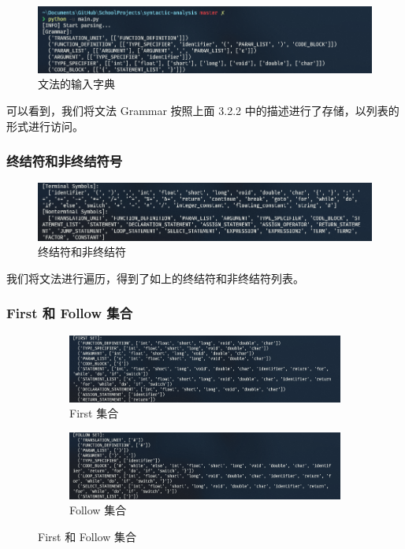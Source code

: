\documentclass[UTF8]{ctexart}
\begin{document}
\begin{figure}[h]
  \includegraphics[width=\linewidth]{images/grammar.png}
  \caption{文法的输入字典}
  \label{fig:figure2}
\end{figure}

可以看到，我们将文法 Grammar 按照上面 3.2.2 中的描述进行了存储，以列表的形式进行访问。

\subsubsection{终结符和非终结符号}

\begin{figure}[h]
  \includegraphics[width=\linewidth]{images/term_non.png}
  \caption{终结符和非终结符}
  \label{fig:figure3}
\end{figure}

我们将文法进行遍历，得到了如上的终结符和非终结符列表。

\subsubsection{First 和 Follow 集合}

\begin{figure}[h]
  \begin{subfigure}{\textwidth}
    \includegraphics[width=\linewidth]{images/first.png}
    \caption{First 集合}
  \end{subfigure}
  \begin{subfigure}{\textwidth}
    \includegraphics[width=\linewidth]{images/follow.png}
    \caption{Follow 集合}
  \end{subfigure}
  \caption{First 和 Follow 集合}
  \label{fig:figure4}
\end{figure}
\end{document}
